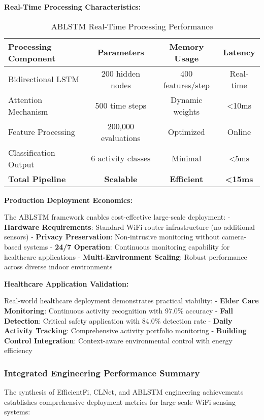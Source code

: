 \documentclass[journal]{IEEEtran}
\begin{document}
{\textbf{Real-Time Processing Characteristics:}

\begin{table}[h]
\centering
\begin{tabular}{|l|c|c|c|}
\hline
\textbf{Processing Component} & \textbf{Parameters} & \textbf{Memory Usage} & \textbf{Latency} \\
\hline
Bidirectional LSTM & 200 hidden nodes & 400 features/step & Real-time \\
Attention Mechanism & 500 time steps & Dynamic weights & <10ms \\
Feature Processing & 200,000 evaluations & Optimized & Online \\
Classification Output & 6 activity classes & Minimal & <5ms \\
\textbf{Total Pipeline} & \textbf{Scalable} & \textbf{Efficient} & \textbf{<15ms} \\
\hline
\end{tabular}
\caption{ABLSTM Real-Time Processing Performance}
\label{tab:ablstm_realtime}
\end{table}

\textbf{Production Deployment Economics:}

The ABLSTM framework enables cost-effective large-scale deployment:
- \textbf{Hardware Requirements}: Standard WiFi router infrastructure (no additional sensors)
- \textbf{Privacy Preservation}: Non-intrusive monitoring without camera-based systems
- \textbf{24/7 Operation}: Continuous monitoring capability for healthcare applications
- \textbf{Multi-Environment Scaling}: Robust performance across diverse indoor environments

\textbf{Healthcare Application Validation:}

Real-world healthcare deployment demonstrates practical viability:
- \textbf{Elder Care Monitoring}: Continuous activity recognition with 97.0\% accuracy
- \textbf{Fall Detection}: Critical safety application with 84.0\% detection rate
- \textbf{Daily Activity Tracking}: Comprehensive activity portfolio monitoring
- \textbf{Building Control Integration}: Context-aware environmental control with energy efficiency

\subsubsection{Integrated Engineering Performance Summary}

The synthesis of EfficientFi, CLNet, and ABLSTM engineering achievements establishes comprehensive deployment metrics for large-scale WiFi sensing systems:

}
\end{document}

